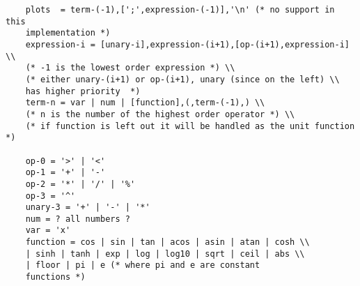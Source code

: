 \begin{verbatim}
    plots  = term-(-1),[';',expression-(-1)],'\n' (* no support in this
    implementation *)
    expression-i = [unary-i],expression-(i+1),[op-(i+1),expression-i]  \\
    (* -1 is the lowest order expression *) \\
    (* either unary-(i+1) or op-(i+1), unary (since on the left) \\
    has higher priority  *)
    term-n = var | num | [function],(,term-(-1),) \\
    (* n is the number of the highest order operator *) \\
    (* if function is left out it will be handled as the unit function *)

    op-0 = '>' | '<'
    op-1 = '+' | '-'
    op-2 = '*' | '/' | '%'
    op-3 = '^'
    unary-3 = '+' | '-' | '*' 
    num = ? all numbers ?
    var = 'x'
    function = cos | sin | tan | acos | asin | atan | cosh \\
    | sinh | tanh | exp | log | log10 | sqrt | ceil | abs \\
    | floor | pi | e (* where pi and e are constant
    functions *)
\end{verbatim}
